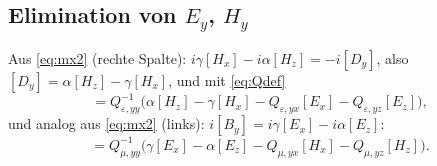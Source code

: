 \subsection{Elimination von $E_y$, $H_y$}
Aus \eqref{eq:mx2} (rechte Spalte): $i\gamma[H_x]-i\alpha[H_z]=-i[D_y]$, also
$[D_y]=\alpha[H_z]-\gamma[H_x]$, und mit \eqref{eq:Qdef}
\begin{equation}
  [E_y]=Q_{\varepsilon,yy}^{-1}\big(\alpha[H_z]-\gamma[H_x]-Q_{\varepsilon,yx}[E_x]-Q_{\varepsilon,yz}[E_z]\big),
  \label{eq:Ey}
\end{equation}
und analog aus \eqref{eq:mx2} (links): $i[B_y]=i\gamma[E_x]-i\alpha[E_z]$:
\begin{equation}
  [H_y]=Q_{\mu,yy}^{-1}\big(\gamma[E_x]-\alpha[E_z]-Q_{\mu,yx}[H_x]-Q_{\mu,yz}[H_z]\big).
  \label{eq:Hy}
\end{equation}

